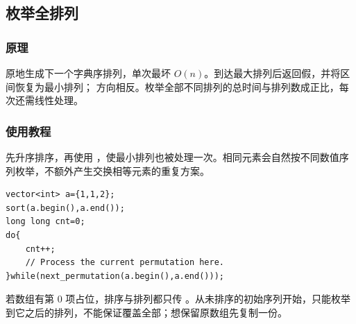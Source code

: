 \subsection{枚举全排列}
\label{stl:permutation}
\subsubsection*{原理}
 原地生成下一个字典序排列，单次最坏 $O(n)$。到达最大排列后返回假，并将区间恢复为最小排列； 方向相反。枚举全部不同排列的总时间与排列数成正比，每次还需线性处理。
\subsubsection*{使用教程}
先升序排序，再使用 ，使最小排列也被处理一次。相同元素会自然按不同数值序列枚举，不额外产生交换相等元素的重复方案。
\begin{lstlisting}[style=mtycpp,numbers=none]
vector<int> a={1,1,2};
sort(a.begin(),a.end());
long long cnt=0;
do{
	cnt++;
	// Process the current permutation here.
}while(next_permutation(a.begin(),a.end()));
\end{lstlisting}
若数组有第 0 项占位，排序与排列都只传 。从未排序的初始序列开始，只能枚举到它之后的排列，不能保证覆盖全部；想保留原数组先复制一份。
